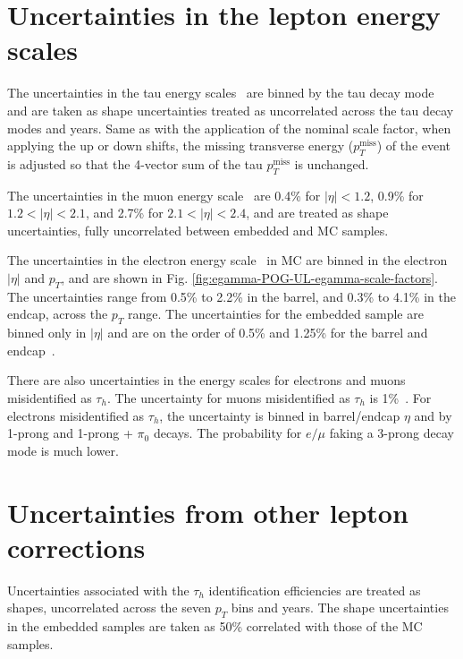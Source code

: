 \section{Uncertainties in the lepton energy scales}
\label{section:uncertainties_lepton_energy_scales}
The uncertainties in the tau energy scales~\cite{twiki_TAU_POG_tauidrecommendationforrun2} are binned by the tau decay mode and are taken as shape uncertainties treated as uncorrelated across the tau decay modes and years. Same as with the application of the nominal scale factor, when applying the up or down shifts, the missing transverse energy ($p_{T}^{\text{miss}}$) of the event is adjusted so that the 4-vector sum of the tau $p_{T}^{\text{miss}}$ is unchanged.

The uncertainties in the muon energy scale~\cite{twiki_MUON_POG_recommendation} are 0.4\% for $|\eta| < 1.2$, 0.9\% for $1.2 < |\eta| < 2.1$, and 2.7\% for $2.1 < |\eta| < 2.4$, and are treated as shape uncertainties, fully uncorrelated between embedded and MC samples.

The uncertainties in the electron energy scale~\cite{twiki_Electron_POG_recommendation} in MC are binned in the electron $|\eta|$ and $p_{T}$, and are shown in Fig. \ref{fig:egamma-POG-UL-egamma-scale-factors}. The uncertainties range from 0.5\% to 2.2\% in the barrel, and 0.3\% to 4.1\% in the endcap, across the $p_{T}$ range. The uncertainties for the embedded sample are binned only in $|\eta|$ and are on the order of 0.5\% and 1.25\% for the barrel and endcap~\cite{twiki_embedded_preUL_2018}.

There are also uncertainties in the energy scales for electrons and muons misidentified as $\tau_{h}$. The uncertainty for muons misidentified as $\tau_{h}$ is 1\%~\cite{twiki_TAU_POG_tauidrecommendationforrun2}. For electrons misidentified as $\tau_{h}$, the uncertainty is binned in barrel/endcap $\eta$ and by 1-prong and 1-prong + $\pi_0$ decays. The probability for $e/\mu$ faking a 3-prong decay mode is much lower. 

\section{Uncertainties from other lepton corrections}
Uncertainties associated with the $\tau_{h}$ identification efficiencies are treated as shapes, uncorrelated across the seven $p_{T}$ bins and years. The shape uncertainties in the embedded samples are taken as 50\% correlated with those of the MC samples.

